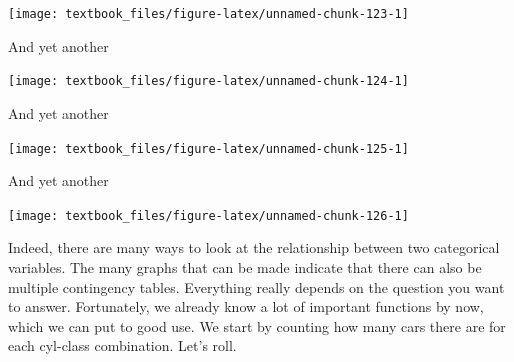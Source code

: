 \documentclass[]{tufte-book}
\newenvironment{Shaded}{}{}
\newcommand{\DataTypeTok}[1]{\textcolor[rgb]{0.56,0.13,0.00}{#1}}
\newcommand{\KeywordTok}[1]{\textcolor[rgb]{0.00,0.44,0.13}{\textbf{#1}}}
\newcommand{\NormalTok}[1]{#1}
\newcommand{\OperatorTok}[1]{\textcolor[rgb]{0.40,0.40,0.40}{#1}}
\newcommand{\StringTok}[1]{\textcolor[rgb]{0.25,0.44,0.63}{#1}}
\begin{document}
\texttt{[image: textbook\_files/figure-latex/unnamed-chunk-123-1]}

And yet another

\begin{Shaded}
\end{Shaded}

\texttt{[image: textbook\_files/figure-latex/unnamed-chunk-124-1]}

And yet another

\begin{Shaded}
\end{Shaded}

\texttt{[image: textbook\_files/figure-latex/unnamed-chunk-125-1]}

And yet another

\begin{Shaded}
\end{Shaded}

\texttt{[image: textbook\_files/figure-latex/unnamed-chunk-126-1]}

Indeed, there are many ways to look at the relationship between two categorical variables. The many graphs that can be made indicate that there can also be multiple contingency tables. Everything really depends on the question you want to answer. Fortunately, we already know a lot of important functions by now, which we can put to good use. We start by counting how many cars there are for each cyl-class combination. Let's roll.
\end{document}
